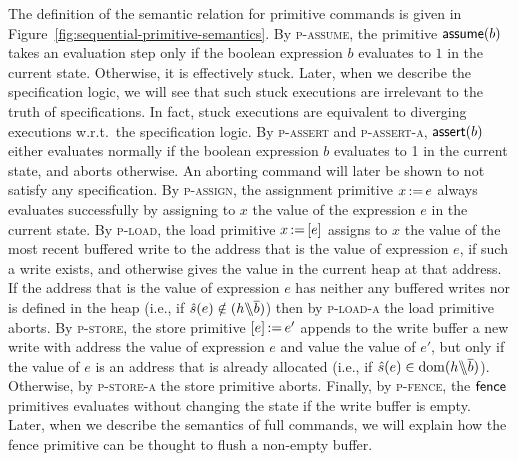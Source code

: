 \documentclass[11pt]{report}         %
\begin{document}
The definition of the semantic relation for primitive commands is given in Figure~\ref{fig:sequential-primitive-semantics}. By \textsc{p-assume}, the primitive $\operatorname{\mathsf{assume}}(b)$ takes an evaluation step only if the boolean expression $b$ evaluates to $1$ in the current state. Otherwise, it is effectively stuck. Later, when we describe the specification logic, we will see that such stuck executions are irrelevant to the truth of specifications. In fact, stuck executions are equivalent to diverging executions w.r.t.\ the specification logic. By \textsc{p-assert} and \textsc{p-assert-a}, $\operatorname{\mathsf{assert}}(b)$ either evaluates normally if the boolean expression $b$ evaluates to 1 in the current state, and aborts otherwise. An aborting command will later be shown to not satisfy any specification. By \textsc{p-assign}, the assignment primitive $x \operatorname{:\!=} e$ always evaluates successfully by assigning to $x$ the value of the expression $e$ in the current state. By \textsc{p-load}, the load primitive $x \operatorname{:\!=} \left[ e \right]$ assigns to $x$ the value of the most recent buffered write to the address that is the value of expression $e$, if such a write exists, and otherwise gives the value in the current heap at that address. If the address that is the value of expression $e$ has neither any buffered writes nor is defined in the heap (i.e., if $\hat{s}(e) \notin (h \backslash\!\!\backslash \overline{b})$) then by \textsc{p-load-a} the load primitive aborts. By \textsc{p-store}, the store primitive $\left[ e \right] \operatorname{:\!=} e'$ appends to the write buffer a new write with address the value of expression $e$ and value the value of $e'$, but only if the value of $e$ is an address that is already allocated (i.e., if $\hat{s}(e) \in \operatorname{\mathrm{dom}}(h \backslash\!\!\backslash \overline{b})$). Otherwise, by \textsc{p-store-a} the store primitive aborts. Finally, by \textsc{p-fence}, the $\operatorname{\mathsf{fence}}$ primitives evaluates without changing the state if the write buffer is empty. Later, when we describe the semantics of full commands, we will explain how the fence primitive can be thought to flush a non-empty buffer. 
\end{document}

